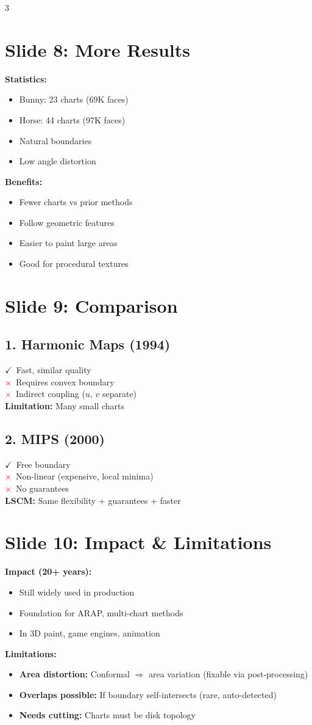 \documentclass[10pt,landscape]{article}
\newcommand{\slide}[1]{\section*{Slide #1}}
\newcommand{\pro}{\textcolor{green!60!black}{$\checkmark$}}
\newcommand{\con}{\textcolor{red}{$\times$}}
\begin{document}
\begin{multicols}{3}
\slide{8: More Results}
\textbf{Statistics:}
\begin{itemize}
\item Bunny: 23 charts (69K faces)
\item Horse: 44 charts (97K faces)
\item Natural boundaries
\item Low angle distortion
\end{itemize}

\textbf{Benefits:}
\begin{itemize}
\item Fewer charts vs prior methods
\item Follow geometric features
\item Easier to paint large areas
\item Good for procedural textures
\end{itemize}

\slide{9: Comparison}
\subsection*{1. Harmonic Maps (1994)}
\pro\ Fast, similar quality\\
\con\ Requires convex boundary\\
\con\ Indirect coupling ($u$, $v$ separate)\\
\textbf{Limitation:} Many small charts

\subsection*{2. MIPS (2000)}
\pro\ Free boundary\\
\con\ Non-linear (expensive, local minima)\\
\con\ No guarantees\\
\textbf{LSCM:} Same flexibility + guarantees + faster

\slide{10: Impact \& Limitations}
\textbf{Impact (20+ years):}
\begin{itemize}
\item Still widely used in production
\item Foundation for ARAP, multi-chart methods
\item In 3D paint, game engines, animation
\end{itemize}

\textbf{Limitations:}
\begin{itemize}
\item \textbf{Area distortion:} Conformal $\Rightarrow$ area variation (fixable via post-processing)
\item \textbf{Overlaps possible:} If boundary self-intersects (rare, auto-detected)
\item \textbf{Needs cutting:} Charts must be disk topology
\end{itemize}


\end{multicols}
\end{document}
